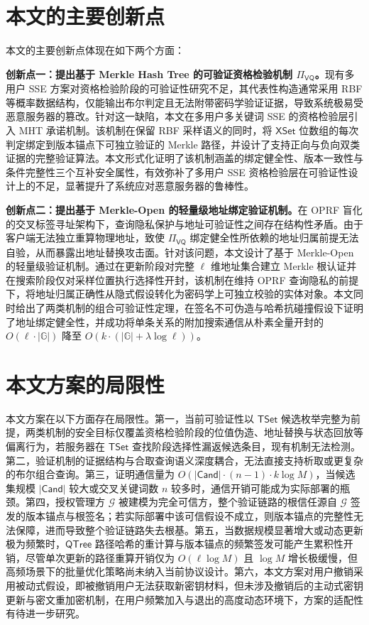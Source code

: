 \section{本文的主要创新点}

本文的主要创新点体现在如下两个方面：

\textbf{创新点一：提出基于 Merkle Hash Tree 的可验证资格检验机制 $\Pi_{\mathsf{VQ}}$。}现有多用户 SSE 方案对资格检验阶段的可验证性研究不足，其代表性构造通常采用 RBF 等概率数据结构，仅能输出布尔判定且无法附带密码学验证证据，导致系统极易受恶意服务器的篡改。针对这一缺陷，本文在多用户多关键词 SSE 的资格检验层引入 MHT 承诺机制。该机制在保留 RBF 采样语义的同时，将 $\mathsf{XSet}$ 位数组的每次判定绑定到版本锚点下可独立验证的 Merkle 路径，并设计了支持正向与负向双类证据的完整验证算法。本文形式化证明了该机制涵盖的绑定健全性、版本一致性与条件完整性三个互补安全属性，有效弥补了多用户 SSE 资格检验层在可验证性设计上的不足，显著提升了系统应对恶意服务器的鲁棒性。

\textbf{创新点二：提出基于 Merkle-Open 的轻量级地址绑定验证机制。}在 OPRF 盲化的交叉标签寻址架构下，查询隐私保护与地址可验证性之间存在结构性矛盾。由于客户端无法独立重算物理地址，致使 $\Pi_{\mathsf{VQ}}$ 绑定健全性所依赖的地址归属前提无法自验，从而暴露出地址替换攻击面。针对该问题，本文设计了基于 Merkle-Open 的轻量级验证机制。通过在更新阶段对完整 $\ell$ 维地址集合建立 Merkle 根认证并在搜索阶段仅对采样位置执行选择性开封，该机制在维持 OPRF 查询隐私的前提下，将地址归属正确性从隐式假设转化为密码学上可独立校验的实体对象。本文同时给出了两类机制的组合可验证性定理，在签名不可伪造与哈希抗碰撞假设下证明了地址绑定健全性，并成功将单条关系的附加搜索通信从朴素全量开封的 $O(\ell \cdot |\mathbb{G}|)$ 降至 $O(k \cdot (|\mathbb{G}|+\lambda \log \ell))$。

\section{本文方案的局限性}

本文方案在以下方面存在局限性。第一，当前可验证性以 $\mathsf{TSet}$ 候选枚举完整为前提，两类机制的安全目标仅覆盖资格检验阶段的位值伪造、地址替换与状态回放等偏离行为，若服务器在 $\mathsf{TSet}$ 查找阶段选择性漏返候选条目，现有机制无法检测。第二，验证机制的证据结构与合取查询语义深度耦合，无法直接支持析取或更复杂的布尔组合查询。第三，证明通信量为 $O(|\mathsf{Cand}|\cdot(n-1)\cdot k\log M)$，当候选集规模 $|\mathsf{Cand}|$ 较大或交叉关键词数 $n$ 较多时，通信开销可能成为实际部署的瓶颈。第四，授权管理方 $\mathcal{G}$ 被建模为完全可信方，整个验证链路的根信任源自 $\mathcal{G}$ 签发的版本锚点与根签名；若实际部署中该可信假设不成立，则版本锚点的完整性无法保障，进而导致整个验证链路失去根基。第五，当数据规模显著增大或动态更新极为频繁时，$\mathsf{QTree}$ 路径哈希的重计算与版本锚点的频繁签发可能产生累积性开销，尽管单次更新的路径重算开销仅为 $O(\ell\log M)$ 且 $\log M$ 增长极缓慢，但高频场景下的批量优化策略尚未纳入当前协议设计。第六，本文方案对用户撤销采用被动式假设，即被撤销用户无法获取新密钥材料，但未涉及撤销后的主动式密钥更新与密文重加密机制，在用户频繁加入与退出的高度动态环境下，方案的适配性有待进一步研究。

